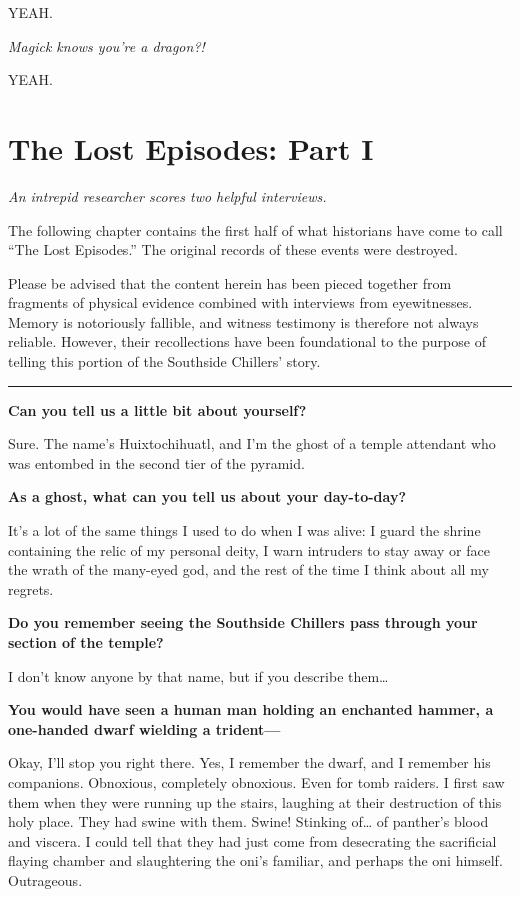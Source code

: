 \documentclass[smalldemyvopaper,11pt,twoside,onecolumn,openright,extrafontsizes]{memoir}
\newcommand{\chapdesc}[1]{
    \begin{flushright}
    \emph{{#1}}
    \end{flushright}
    \vspace{26pt}
}
\begin{document}
YEAH.

\emph{Magick knows you're a dragon?!}

YEAH.


\chapter{The Lost Episodes: Part I}
\chapdesc{An intrepid researcher scores two helpful interviews.}

The following chapter contains the first half of what historians have
come to call ``The Lost Episodes.'' The original records of these events
were destroyed.

Please be advised that the content herein has been pieced together from
fragments of physical evidence combined with interviews from
eyewitnesses. Memory is notoriously fallible, and witness testimony is
therefore not always reliable. However, their recollections have been
foundational to the purpose of telling this portion of the Southside
Chillers' story.

\begin{center}\rule{0.5\linewidth}{\linethickness}\end{center}

\textbf{Can you tell us a little bit about yourself?}

Sure. The name's Huixtochihuatl, and I'm the ghost of a temple attendant
who was entombed in the second tier of the pyramid.

\textbf{As a ghost, what can you tell us about your day-to-day?}

It's a lot of the same things I used to do when I was alive: I guard the
shrine containing the relic of my personal deity, I warn intruders to
stay away or face the wrath of the many-eyed god, and the rest of the
time I think about all my regrets.

\textbf{Do you remember seeing the Southside Chillers pass through your
section of the temple?}

I don't know anyone by that name, but if you describe them\ldots{}

\textbf{You would have seen a human man holding an enchanted hammer, a
one-handed dwarf wielding a trident---}

Okay, I'll stop you right there. Yes, I remember the dwarf, and I
remember his companions. Obnoxious, completely obnoxious. Even for tomb
raiders. I first saw them when they were running up the stairs, laughing
at their destruction of this holy place. They had swine with them.
Swine! Stinking of\ldots{} of panther's blood and viscera. I could tell
that they had just come from desecrating the sacrificial flaying chamber
and slaughtering the oni's familiar, and perhaps the oni himself.
Outrageous.
\end{document}
